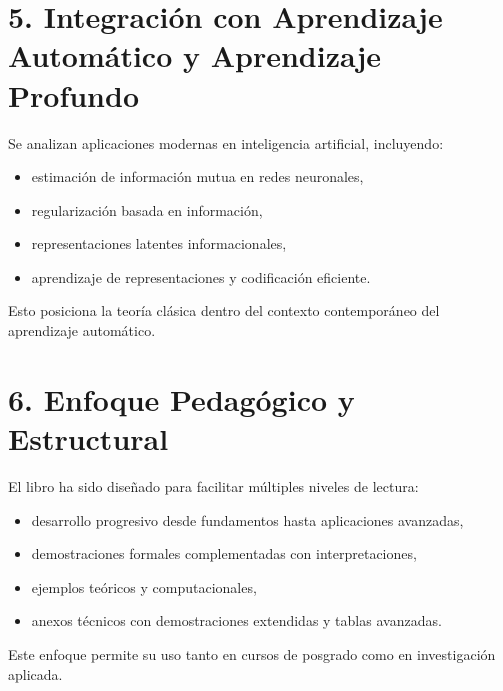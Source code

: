 \documentclass[letterpaper,10pt,english]{jupyterBook}
\begin{document}
\section{5. Integración con Aprendizaje Automático y Aprendizaje Profundo}
\label{\detokenize{00_frontmatter/contributions:integracion-con-aprendizaje-automatico-y-aprendizaje-profundo}}
\sphinxAtStartPar
Se analizan aplicaciones modernas en inteligencia artificial, incluyendo:
\begin{itemize}
\item {} 
\sphinxAtStartPar
estimación de información mutua en redes neuronales,

\item {} 
\sphinxAtStartPar
regularización basada en información,

\item {} 
\sphinxAtStartPar
representaciones latentes informacionales,

\item {} 
\sphinxAtStartPar
aprendizaje de representaciones y codificación eficiente.

\end{itemize}

\sphinxAtStartPar
Esto posiciona la teoría clásica dentro del contexto contemporáneo del aprendizaje automático.


\section{6. Enfoque Pedagógico y Estructural}
\label{\detokenize{00_frontmatter/contributions:enfoque-pedagogico-y-estructural}}
\sphinxAtStartPar
El libro ha sido diseñado para facilitar múltiples niveles de lectura:
\begin{itemize}
\item {} 
\sphinxAtStartPar
desarrollo progresivo desde fundamentos hasta aplicaciones avanzadas,

\item {} 
\sphinxAtStartPar
demostraciones formales complementadas con interpretaciones,

\item {} 
\sphinxAtStartPar
ejemplos teóricos y computacionales,

\item {} 
\sphinxAtStartPar
anexos técnicos con demostraciones extendidas y tablas avanzadas.

\end{itemize}

\sphinxAtStartPar
Este enfoque permite su uso tanto en cursos de posgrado como en investigación aplicada.
\end{document}
